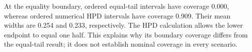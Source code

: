 At the equality boundary, ordered equal-tail intervals have coverage 0.000, whereas ordered numerical HPD intervals have coverage 0.909. Their mean widths are 0.254 and 0.233, respectively. The HPD calculation allows the lower endpoint to equal one half. This explains why its boundary coverage differs from the equal-tail result; it does not establish nominal coverage in every scenario.
